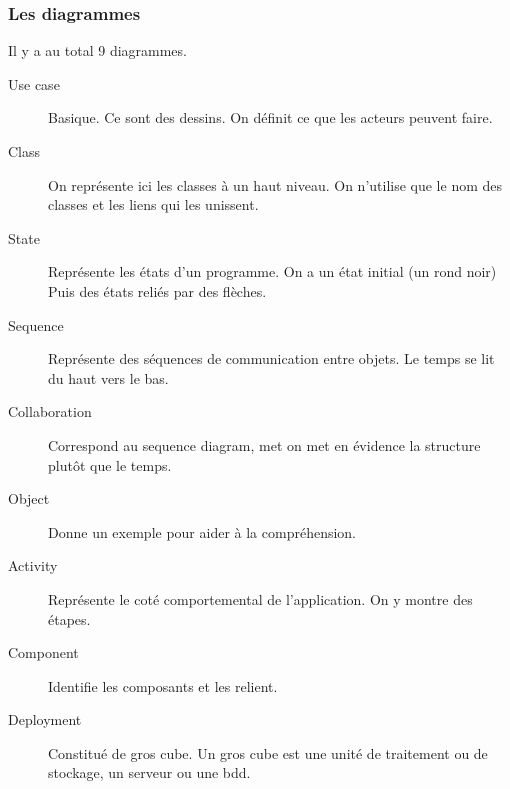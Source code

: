 \subsubsection{Les diagrammes}
Il y a au total 9 diagrammes.
\begin{description}
	\item [Use case] Basique. Ce sont des dessins. On définit ce que les acteurs peuvent faire.
    
	\item [Class] On représente ici les classes à un haut niveau. On n’utilise que le nom des classes et les liens qui les unissent.
    
	\item [State] Représente les états d’un programme. On a un état initial (un rond noir) Puis des états reliés par des flèches.
    
	\item [Sequence] Représente des séquences de communication entre objets. Le temps se lit du haut vers le bas.
    
	\item [Collaboration] Correspond au sequence diagram, met on met en évidence la structure plutôt que le temps.
    
	\item [Object] Donne un exemple pour aider à la compréhension.
    
	\item [Activity] Représente le coté comportemental de l’application. On y montre des étapes.
    
	\item [Component] Identifie les composants et les relient.
    
	\item [Deployment] Constitué de gros cube. Un gros cube est une unité de traitement ou de stockage, un serveur ou une bdd.
    
\end{description}